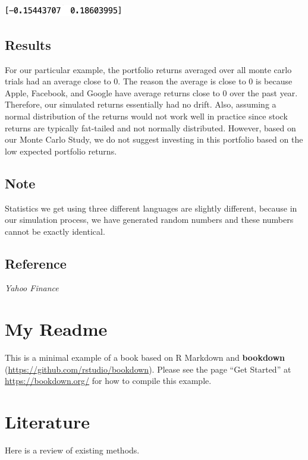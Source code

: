 \documentclass[]{book}
\begin{document}
\includegraphics[width=200px]{./Stats506/Python_pics/CI}

\hypertarget{results}{%
\section{Results}\label{results}}

For our particular example, the portfolio returns averaged over all monte carlo
trials had an average close to 0. The reason the average is close to 0 is
because Apple, Facebook, and Google have average returns close to 0 over the past year.
Therefore, our simulated returns essentially had no drift. Also, assuming a
normal distribution of the returns would not work well in practice since
stock returns are typically fat-tailed and not normally distributed. However, based on our
Monte Carlo Study, we do not suggest investing in this portfolio based on the
low expected portfolio returns.

\hypertarget{note}{%
\section{Note}\label{note}}

Statistics we get using three different languages are slightly different, because in our simulation
process, we have generated random numbers and these numbers cannot be exactly identical.

\hypertarget{reference}{%
\section{Reference}\label{reference}}

\emph{Yahoo Finance}

\hypertarget{my-readme}{%
\chapter{My Readme}\label{my-readme}}

This is a minimal example of a book based on R Markdown and \textbf{bookdown} (\url{https://github.com/rstudio/bookdown}). Please see the page ``Get Started'' at \url{https://bookdown.org/} for how to compile this example.

\hypertarget{literature}{%
\chapter{Literature}\label{literature}}

Here is a review of existing methods.


\end{document}
